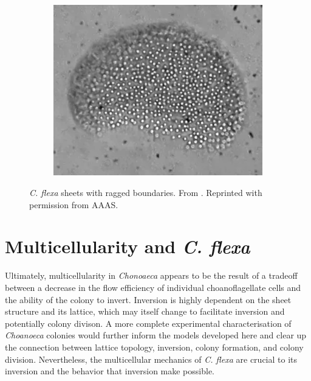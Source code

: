 \begin{figure}
\begin{subfigure}[b]{0.49\textwidth}
		\includegraphics[width=\textwidth]{edges2.png}
		\caption{}
		\label{subfig:edges2}
	\end{subfigure}
	\caption[\textit{C. flexa} sheets with ragged boundaries]{\textit{C. flexa} sheets with ragged boundaries. From \citet{brunet2019}. Reprinted with permission from AAAS.}
	\label{fig:edges}
\end{figure}

\section{Multicellularity and \textit{C. flexa}}


Ultimately, multicellularity in \textit{Chonoaeca} appears to be the result of a tradeoff between a decrease in the flow efficiency of individual choanoflagellate cells and the ability of the colony to invert. 
Inversion is highly dependent on the sheet structure and its lattice, which may itself change to facilitate inversion and potentially colony divison. 
A more complete experimental characterisation of \textit{Choanoeca} colonies would further inform the models developed here and clear up the connection between lattice topology, inversion, colony formation, and colony division.
Nevertheless, the multicellular mechanics of \textit{C. flexa} are crucial to its inversion and the behavior that inversion make possible.

